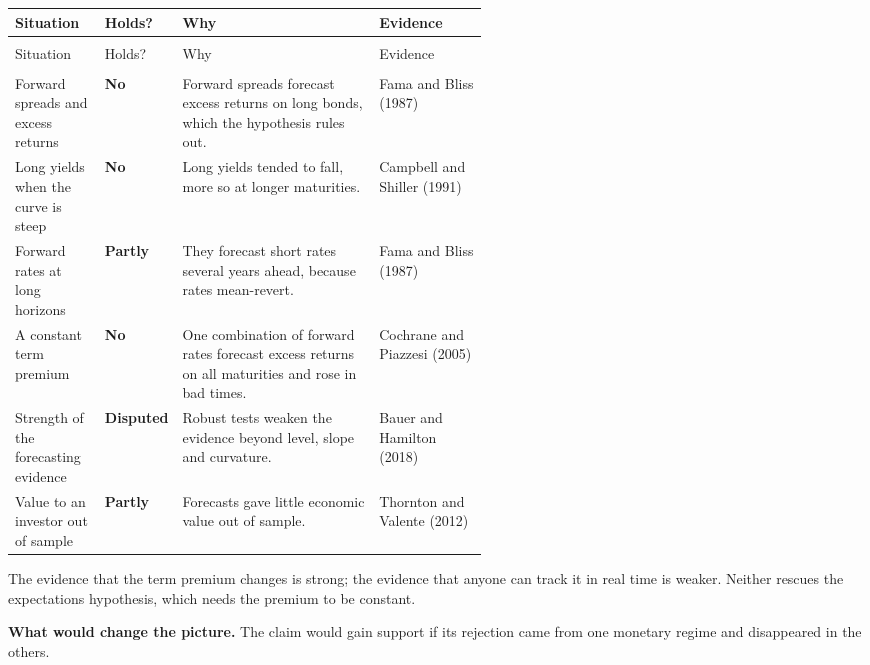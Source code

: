 {\small
\begin{longtable}{@{}>{\raggedright\arraybackslash}p{0.19\linewidth}>{\raggedright\arraybackslash}p{0.13\linewidth}>{\raggedright\arraybackslash}p{}>{\raggedright\arraybackslash}p{0.23\linewidth}@{}}
\toprule
Situation & Holds? & Why & Evidence \\
\midrule
\endfirsthead
\multicolumn{4}{@{}l}{\emph{(continued)}} \\
\toprule
Situation & Holds? & Why & Evidence \\
\midrule
\endhead
\midrule
\multicolumn{4}{r@{}}{\emph{(continued on the next page)}} \\
\endfoot
\bottomrule
\endlastfoot
Forward spreads and excess returns & \textbf{No} & Forward spreads forecast excess returns on long bonds, which the hypothesis rules out. & Fama and Bliss (1987) \\*
\addlinespace[3pt]
Long yields when the curve is steep & \textbf{No} & Long yields tended to fall, more so at longer maturities. & Campbell and Shiller (1991) \\
\addlinespace[3pt]
Forward rates at long horizons & \textbf{Partly} & They forecast short rates several years ahead, because rates mean-revert. & Fama and Bliss (1987) \\
\addlinespace[3pt]
A constant term premium & \textbf{No} & One combination of forward rates forecast excess returns on all maturities and rose in bad times. & Cochrane and Piazzesi (2005) \\
\addlinespace[3pt]
Strength of the forecasting evidence & \textbf{Disputed} & Robust tests weaken the evidence beyond level, slope and curvature. & Bauer and Hamilton (2018) \\*
\addlinespace[3pt]
Value to an investor out of sample & \textbf{Partly} & Forecasts gave little economic value out of sample. & Thornton and Valente (2012) \\
\end{longtable}
\addtocounter{table}{-1}%
}

The evidence that the term premium changes is strong; the evidence that anyone can track it in real time is weaker. Neither rescues the expectations hypothesis, which needs the premium to be constant.

\textbf{What would change the picture.} The claim would gain support if its rejection came from one monetary regime and disappeared in the others.

